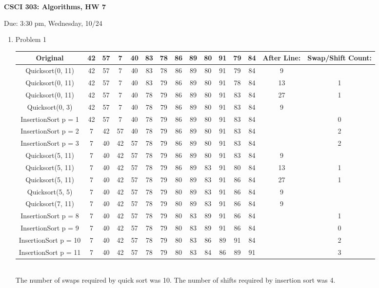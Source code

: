 \documentclass[11pt]{article}
\begin{document}
\begin{LARGE}
\centerline {\bf CSCI 303: Algorithms, HW 7}
\end{LARGE}
\vskip 0.25cm
\centerline{Due: 3:30 pm, Wednesday, 10/24}

\begin{enumerate}
\item Problem 1\\
\begin{center}
\begin{tabular}{c|cccccccccccc|cc}
Original & 42& 57& 7& 40& 83& 78& 86& 89& 80& 91& 79& 84 & After Line:& Swap/Shift Count:\\\hline
Quicksort(0, 11)&42& 57& 7& 40& 83& 78& 86& 89& 80& 91& 79& 84&9\\
Quicksort(0, 11)&42& 57& 7& 40& 83& 79& 86& 89& 80& 91& 78& 84&13&1\\
Quicksort(0, 11)&42& 57& 7& 40& 78& 79& 86& 89& 80& 91& 83& 84&27&1\\
Quicksort(0, 3)&42& 57& 7& 40& 78& 79& 86& 89& 80& 91& 83& 84&9\\
InsertionSort p = 1 &42& 57& 7& 40& 78& 79& 86& 89& 80& 91& 83& 84&&0\\
InsertionSort p = 2 &7& 42& 57& 40& 78& 79& 86& 89& 80& 91& 83& 84&&2\\
InsertionSort p = 3 &7& 40& 42& 57& 78& 79& 86& 89& 80& 91& 83& 84&&2\\
Quicksort(5, 11)&7& 40& 42& 57& 78& 79& 86& 89& 80& 91& 83& 84&9&\\
Quicksort(5, 11)&7& 40& 42& 57& 78& 79& 86& 89& 83& 91& 80& 84&13&1\\
Quicksort(5, 11)&7& 40& 42& 57& 78& 79& 80& 89& 83& 91& 86& 84&27&1\\
Quicksort(5, 5)&7& 40& 42& 57& 78& 79& 80& 89& 83& 91& 86& 84&9&\\
Quicksort(7, 11)&7& 40& 42& 57& 78& 79& 80& 89& 83& 91& 86& 84&9&\\
InsertionSort p = 8 &7& 40& 42& 57& 78& 79& 80& 83& 89& 91& 86& 84&&1\\
InsertionSort p = 9 &7& 40& 42& 57& 78& 79& 80& 83& 89& 91& 86& 84&&0\\
InsertionSort p = 10 &7& 40& 42& 57& 78& 79& 80& 83& 86& 89& 91& 84&&2\\
InsertionSort p = 11 &7& 40& 42& 57& 78& 79& 80& 83& 84& 86& 89& 91&&3

\end{tabular}
\end{center}
\\The number of swaps required by quick sort was 10. The number of shifts required by insertion sort was 4.


\end{enumerate}
\end{document}
